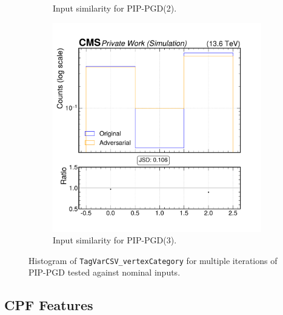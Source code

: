 \begin{figure}[htbp]
\begin{subfigure}[t]{0.32\textwidth}
    \caption*{Input similarity for PIP-PGD(2).}
  \end{subfigure}\hfill
  \begin{subfigure}[t]{0.32\textwidth}
    \includegraphics[width=\linewidth]{media/output/features/compare/combined_it_3/cmp_global_features_TagVarCSV_vertexCategory.pdf}
    \caption*{Input similarity for PIP-PGD(3).}
  \end{subfigure}

  \caption*{Histogram of \texttt{TagVarCSV\_vertexCategory} for multiple iterations of PIP-PGD tested against nominal inputs.}
  \label{fig:combined_input_TagVarCSV_vertexCategory}
\end{figure}

\newpage
\subsection*{CPF Features}


